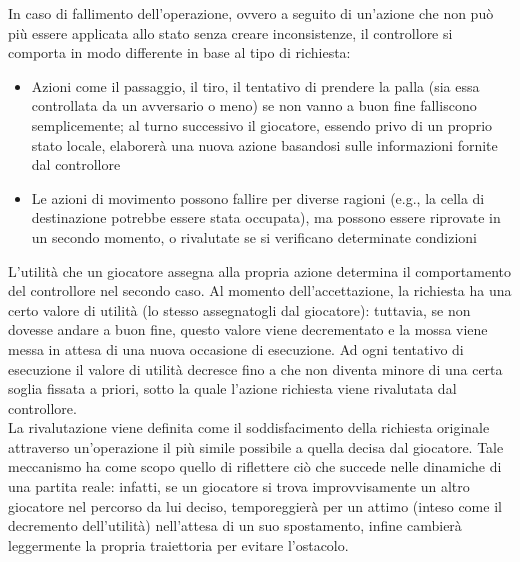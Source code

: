 In caso di fallimento dell'operazione, ovvero a seguito di un'azione che non può più essere applicata allo stato senza creare inconsistenze, il controllore si comporta in modo differente in base al tipo di richiesta:

\begin{itemize}
	\item Azioni come il passaggio, il tiro, il tentativo di prendere la palla (sia essa controllata da un avversario o meno) se non vanno a buon fine falliscono semplicemente; al turno successivo il giocatore, essendo privo di un proprio stato locale, elaborerà una nuova azione basandosi sulle informazioni fornite dal controllore
	\item Le azioni di movimento possono fallire per diverse ragioni (e.g., la cella di destinazione potrebbe essere stata occupata), ma possono essere riprovate in un secondo momento, o rivalutate se si verificano determinate condizioni
\end{itemize}

L'utilità che un giocatore assegna alla propria azione determina il comportamento del controllore nel secondo caso. Al momento dell'accettazione, la richiesta ha una certo valore di utilità (lo stesso assegnatogli dal giocatore): tuttavia, se non dovesse andare a buon fine, questo valore viene decrementato e la mossa viene messa in attesa di una nuova occasione di esecuzione. Ad ogni tentativo di esecuzione il valore di utilità decresce fino a che non diventa minore di una certa soglia fissata a priori, sotto la quale l'azione richiesta viene rivalutata dal controllore.\\

La rivalutazione viene definita come il soddisfacimento della richiesta originale attraverso un'operazione il più simile possibile a quella decisa dal giocatore. Tale meccanismo ha come scopo quello di riflettere ciò che succede nelle dinamiche di una partita reale: infatti, se un giocatore si trova improvvisamente un altro giocatore nel percorso da lui deciso, temporeggierà per un attimo (inteso come il decremento dell'utilità) nell'attesa di un suo spostamento, infine cambierà leggermente la propria traiettoria per evitare l'ostacolo.\\

